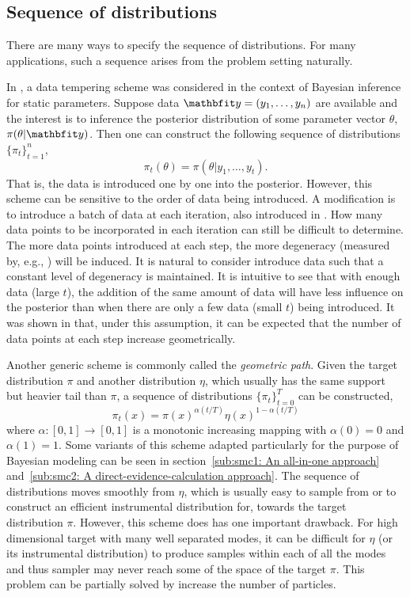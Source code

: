 \subsection{Sequence of distributions}
\label{sub:Sequence of distributions}

There are many ways to specify the sequence of distributions. For many
applications, such a sequence arises from the problem setting naturally.

In \cite{Chopin:2002hg}, a data tempering scheme was considered in the context
of Bayesian inference for static parameters. Suppose data $\data =
(y_1,\dots,y_n)$ are available and the interest is to inference the posterior
distribution of some parameter vector $\theta$, $\pi(\theta|\data)$. Then one
can construct the following sequence of distributions $\{\pi_t\}_{t=1}^n$,
\begin{equation}
  \pi_t(\theta) = \pi(\theta|y_1,\dots,y_t).
\end{equation}
That is, the data is introduced one by one into the posterior. However, this
scheme can be sensitive to the order of data being introduced. A modification
is to introduce a batch of data at each iteration, also introduced in
\cite{Chopin:2002hg}. How many data points to be incorporated in each
iteration can still be difficult to determine. The more data points introduced
at each step, the more degeneracy (measured by, e.g., \ess) will be induced.
It is natural to consider introduce data such that a constant level of
degeneracy is maintained. It is intuitive to see that with enough data (large
$t$), the addition of the same amount of data will have less influence on the
posterior than when there are only a few data (small $t$) being introduced.
It was shown in \cite{Chopin:2002hg} that, under this assumption, it can be
expected that the number of data points at each step increase geometrically.

Another generic scheme is commonly called the \emph{geometric path}. Given the
target distribution $\pi$ and another distribution $\eta$, which usually has
the same support but heavier tail than $\pi$, a sequence of distributions
$\{\pi_t\}_{t=0}^T$ can be constructed,
\begin{equation}
  \pi_t(x) =
  \pi(x)^{\alpha(t/T)}\eta(x)^{1-\alpha(t/T)} \end{equation} where
$\alpha:[0,1]\to[0,1]$ is a monotonic increasing mapping with $\alpha(0) = 0$
and $\alpha(1) = 1$. Some variants of this scheme adapted particularly for the
purpose of Bayesian modeling can be seen in section~\ref{sub:smc1: An
  all-in-one approach} and~\ref{sub:smc2: A direct-evidence-calculation
  approach}. The sequence of distributions moves smoothly from $\eta$, which
is usually easy to sample from or to construct an efficient instrumental
distribution for, towards the target distribution $\pi$. However, this scheme
does has one important drawback. For high dimensional target with many well
separated modes, it can be difficult for $\eta$ (or its instrumental
distribution) to produce samples within each of all the modes and thus sampler
may never reach some of the space of the target $\pi$. This problem can be
partially solved by increase the number of particles.

